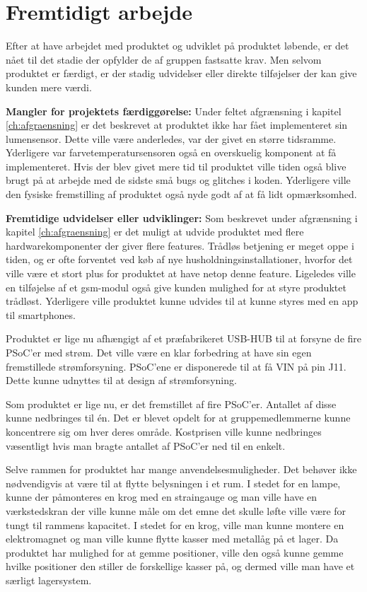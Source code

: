 \chapter{Fremtidigt arbejde}

Efter at have arbejdet med produktet og udviklet på produktet løbende, er det nået til det stadie der opfylder de af gruppen fastsatte krav. Men selvom produktet er færdigt, er der stadig udvidelser eller direkte tilføjelser der kan give kunden mere værdi.

\textbf{Mangler for projektets færdiggørelse:}
Under feltet afgrænsning i kapitel \ref{ch:afgraensning} er det beskrevet at produktet ikke har fået implementeret sin lumensensor. Dette ville være anderledes, var der givet en større tidsramme. Yderligere var farvetemperatursensoren også en overskuelig komponent at få implementeret. Hvis der blev givet mere tid til produktet ville tiden også blive brugt på at arbejde med de sidste små bugs og glitches i koden. 
Yderligere ville den fysiske fremstilling af produktet også nyde godt af at få lidt opmærksomhed. 



\textbf{Fremtidige udvidelser eller udviklinger:}
Som beskrevet under afgrænsning i kapitel \ref{ch:afgraensning} er det muligt at udvide produktet med flere hardwarekomponenter der giver flere features. Trådløs betjening er meget oppe i tiden, og er ofte forventet ved køb af nye husholdningsinstallationer, hvorfor det ville være et stort plus for produktet at have netop denne feature. Ligeledes ville en tilføjelse af et gsm-modul også give kunden mulighed for at styre produktet trådløst. Yderligere ville produktet kunne udvides til at kunne styres med en app til smartphones.

Produktet er lige nu afhængigt af et præfabrikeret USB-HUB til at forsyne de fire PSoC'er med strøm. Det ville være en klar forbedring at have sin egen fremstillede strømforsyning. PSoC'ene er disponerede til at få VIN på pin J11. Dette kunne udnyttes til at design af strømforsyning.

Som produktet er lige nu, er det fremstillet af fire PSoC'er. Antallet af disse kunne nedbringes til én. Det er blevet opdelt for at gruppemedlemmerne kunne koncentrere sig om hver deres område. Kostprisen ville kunne nedbringes væsentligt hvis man bragte antallet af PSoC'er ned til en enkelt.  

Selve rammen for produktet har mange anvendelsesmuligheder. Det behøver ikke nødvendigvis at være til at flytte belysningen i et rum. I stedet for en lampe, kunne der påmonteres en krog med en straingauge og man ville have en værkstedskran der ville kunne måle om det emne det skulle løfte ville være for tungt til rammens kapacitet. I stedet for en krog, ville man kunne montere en elektromagnet og man ville kunne flytte kasser med metallåg på et lager. Da produktet har mulighed for at gemme positioner, ville den også kunne gemme hvilke positioner den stiller de forskellige kasser på, og dermed ville man have et særligt lagersystem.


